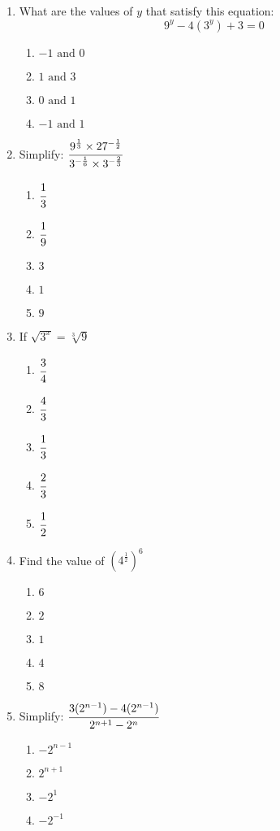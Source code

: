 \begin{multicols}{2}
\begin{enumerate}[label={\arabic*.}]
\item What are the values of $y$ that satisfy this equation:
\[9^y -4(3^y) + 3 = 0\]
	\begin{enumerate}[label={\Alph*.}]
	\item \(-1 \text{ and } 0\)
	\item \(1 \text{ and } 3\)
	\item \(0 \text{ and } 1\)
	\item \(-1 \text{ and } 1\)
	\end{enumerate}
\item Simplify:  $\cfrac{9^{\frac{1}{3}} \times 27^{-\frac{1}{2}}}{3^{-\frac{1}{6}} \times 3^{-\frac{2}{3}}}$
	\begin{enumerate}[label={\Alph*.}]
	\item \(\cfrac{1}{3}\)
	\item \(\cfrac{1}{9}\)
	\item \(3\)
	\item \(1\)
	\item \(9\)
	\end{enumerate}
\item If \(\sqrt{3^x} = \sqrt[3]{9}\)
	\begin{enumerate}[label={\Alph*.}]
	\item \(\cfrac{3}{4}\)
	\item \(\cfrac{4}{3}\)
	\item \(\cfrac{1}{3}\)
	\item \(\cfrac{2}{3}\)
	\item \(\cfrac{1}{2}\)
	\end{enumerate}
\item Find the value of $\left(4^{\frac{1}{2}}\right)^6$
	\begin{enumerate}[label={\Alph*.}]
	\item \(6\)
	\item \(2\)
	\item \(1\)
	\item \(4\)
	\item \(8\)
	\end{enumerate}
\item Simplify: $\cfrac{3(2^{n-1}) - 4(2^{n-1})}{2^{n+1} - 2^n}$
	\begin{enumerate}[label={\Alph*.}]
	\item \(-2^{n-1}\)
	\item \(2^{n+1}\)
	\item \(-2^1\)
	\item \(-2^{-1}\)
	\end{enumerate}

\end{enumerate}
\end{multicols}
